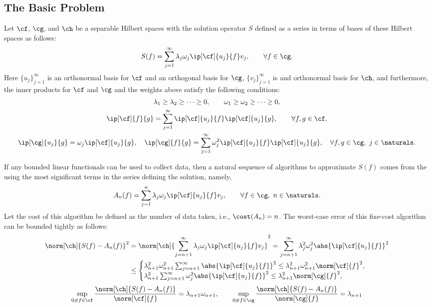 \documentclass[final]{elsarticle}
\theoremstyle{definition}
\theoremstyle{remark}
\begin{document}
\subsection{The Basic Problem}
Let $\cf$, $\cg$, and $\ch$ be a separable Hilbert spaces with the solution operator $S$ defined as a series in terms of bases of these Hilbert spaces as follows:
\begin{equation} \label{HilbertS}
S(f) = \sum_{j=1}^\infty \lambda_j \omega_j \ip[\cf]{u_j}{f} v_j, \qquad \forall f \in \cg.
\end{equation}
Here $\{u_j\}_{j=1}^{\infty}$ is an orthonormal basis for $\cf$ and an orthogonal basis for $\cg$, $\{v_j\}_{j=1}^{\infty}$ is and orthonormal basis for $\ch$, and furthermore, the inner products for $\cf$ and $\cg$ and the weights above satisfy the following conditions:
\begin{gather*}
\lambda_1 \ge \lambda_2 \ge \cdots \ge 0, \qquad \omega_1 \ge \omega_2 \ge \cdots \ge 0, \\
\ip[\cf]{f}{g} = \sum_{j=1}^\infty \ip[\cf]{u_j}{f} \ip[\cf]{u_j}{g}, \qquad \forall f,g \in \cf, \\
\ip[\cg]{u_j}{g}= \omega_j\ip[\cf]{u_j}{g}, \quad \ip[\cg]{f}{g} = \sum_{j=1}^\infty \omega_j^2\ip[\cf]{u_j}{f} \ip[\cf]{u_j}{g}, \quad \forall f,g \in \cg, \ j \in \naturals.
\end{gather*}

If any bounded linear functionals can be used to collect data, then a natural sequence of algorithms to approximate $S(f)$ comes from the using the most significant terms in the series defining the solution, namely,
\begin{equation*}
A_n(f) = \sum_{j=1}^n \lambda_j \omega_j \ip[\cf]{u_j}{f} v_j, \qquad \forall f \in \cg, \ n \in \naturals.
\end{equation*}
Let the cost of this algorithm be defined as the number of data taken, i.e., $\cost(A_n)=n$.  The worst-case error of this fixe-cost algorithm can be bounded tightly as follows:
\begin{align*}
\norm[\ch]{S(f)-A_n(f)}^2 &= \norm[\ch]{\sum_{j=n+1}^\infty \lambda_j \omega_j \ip[\cf]{u_j}{f} v_j}^2 = \sum_{j=n+1}^\infty \lambda_j^2 \omega_j^2 \abs{\ip[\cf]{u_j}{f}}^2 \\
& \le \begin{cases}
\lambda_{n+1}^2 \omega_{n+1}^2 \sum_{j=n+1}^\infty \abs{\ip[\cf]{u_j}{f}}^2 \le \lambda_{n+1}^2 \omega_{n+1}^2 \norm[\cf]{f}^2, \\
\lambda_{n+1}^2 \sum_{j=n+1}^\infty \omega_{j}^2 \abs{\ip[\cf]{u_j}{f}}^2 \le \lambda_{n+1}^2 \norm[\cg]{f}^2,
\end{cases}
\end{align*} 
\begin{equation*}
\sup_{0 \ne f \in \cf}\frac{\norm[\ch]{S(f)-A_n(f)}}{\norm[\cf]{f}} =\lambda_{n+1} \omega_{n+1}, \qquad
\sup_{0 \ne f \in \cg}\frac{\norm[\ch]{S(f)-A_n(f)}}{\norm[\cg]{f}} =\lambda_{n+1}
\end{equation*} 
\end{document}
